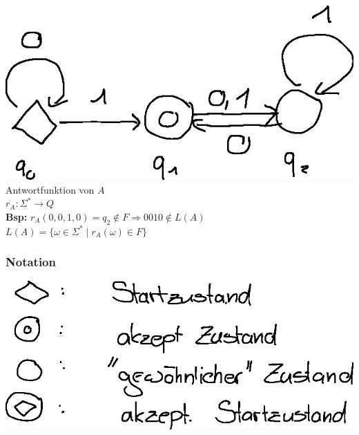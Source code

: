 \documentclass[10pt]{article}
\newcommand{\Bold}[1]{\textbf{#1}} %
\begin{document}
\includegraphics{Bild3.eps}\\
Antwortfunktion von $A$\\
$r_A:\Sigma^*\to Q$\\
\Bold{Bsp:} $r_A(0,0,1,0)=q_2 \notin F\Rightarrow0010\notin L(A)$\\
$L(A)=\{\omega\in\Sigma^*\mid r_A(\omega)\in F\}$
\subsubsection{Notation}
\includegraphics{Bild2.eps}
\end{document}
